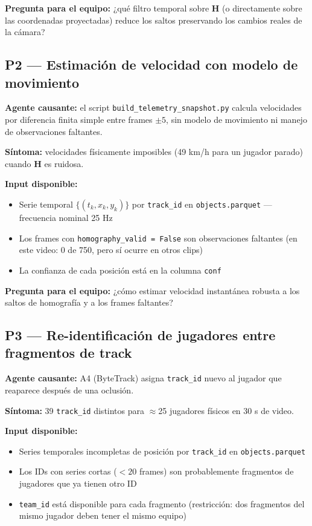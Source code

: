 \documentclass[11pt,a4paper]{article}
\begin{document}
\textbf{Pregunta para el equipo:} ¿qué filtro temporal sobre $\mathbf{H}$ (o
directamente sobre las coordenadas proyectadas) reduce los saltos preservando
los cambios reales de la cámara?

\subsection{P2 — Estimación de velocidad con modelo de movimiento}

\textbf{Agente causante:} el script \texttt{build\_telemetry\_snapshot.py}
calcula velocidades por diferencia finita simple entre frames $\pm 5$,
sin modelo de movimiento ni manejo de observaciones faltantes.

\textbf{Síntoma:} velocidades físicamente imposibles (49 km/h para un
jugador parado) cuando $\mathbf{H}$ es ruidosa.

\textbf{Input disponible:}
\begin{itemize}[noitemsep]
  \item Serie temporal $\{(t_k, x_k, y_k)\}$ por \texttt{track\_id}
        en \texttt{objects.parquet} — frecuencia nominal 25 Hz
  \item Los frames con \texttt{homography\_valid = False} son observaciones
        faltantes (en este video: 0 de 750, pero sí ocurre en otros clips)
  \item La confianza de cada posición está en la columna \texttt{conf}
\end{itemize}

\textbf{Pregunta para el equipo:} ¿cómo estimar velocidad instantánea
robusta a los saltos de homografía y a los frames faltantes?

\subsection{P3 — Re-identificación de jugadores entre fragmentos de track}

\textbf{Agente causante:} A4 (ByteTrack) asigna \texttt{track\_id} nuevo
al jugador que reaparece después de una oclusión.

\textbf{Síntoma:} 39 \texttt{track\_id} distintos para $\approx$25 jugadores
físicos en 30 s de video.

\textbf{Input disponible:}
\begin{itemize}[noitemsep]
  \item Series temporales incompletas de posición por \texttt{track\_id}
        en \texttt{objects.parquet}
  \item Los IDs con series cortas ($< 20$ frames) son probablemente fragmentos
        de jugadores que ya tienen otro ID
  \item \texttt{team\_id} está disponible para cada fragmento (restricción:
        dos fragmentos del mismo jugador deben tener el mismo equipo)
\end{itemize}
\end{document}
